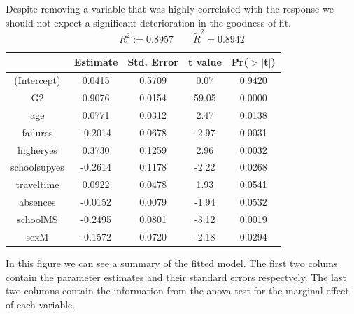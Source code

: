 \documentclass[a4paper, 11pt]{report}
\theoremstyle{definition}
\numberwithin{equation}{section}		%
\numberwithin{table}{section}				%
\begin{document}
\bigskip
Despite removing a variable that was highly correlated with the response we should not expect a significant deterioration in the goodness of fit.
$$\boxed{R^2 := 0.8957 \quad \quad  \tilde{R}^2 =  0.8942}$$
\bigskip
\begin{table}[ht]
\centering
\begin{tabular}{ccccc}
\hline
  & Estimate & Std. Error & t value & Pr($>$$|$t$|$) \\ 
  \hline
(Intercept) & 0.0415 & 0.5709 & 0.07 & 0.9420 \\ 
  G2 & 0.9076 & 0.0154 & 59.05 & 0.0000 \\ 
  age & 0.0771 & 0.0312 & 2.47 & 0.0138 \\ 
  failures & -0.2014 & 0.0678 & -2.97 & 0.0031 \\ 
  higheryes & 0.3730 & 0.1259 & 2.96 & 0.0032 \\ 
  schoolsupyes & -0.2614 & 0.1178 & -2.22 & 0.0268 \\ 
  traveltime & 0.0922 & 0.0478 & 1.93 & 0.0541 \\ 
  absences & -0.0152 & 0.0079 & -1.94 & 0.0532 \\ 
  schoolMS & -0.2495 & 0.0801 & -3.12 & 0.0019 \\ 
  sexM & -0.1572 & 0.0720 & -2.18 & 0.0294 \\ 
   \hline
\end{tabular}
\end{table}

In this figure we can see a summary of the fitted model. The first two colums contain the parameter estimates and their standard errors respectvely. The last two columns contain the information from the anova test for the marginal effect of each variable. \bigskip
\end{document}
